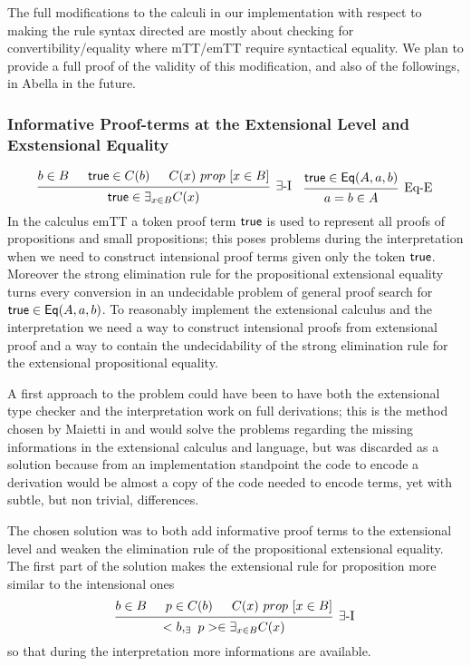 	The full modifications to the calculi in our implementation with respect to making the rule syntax directed are mostly about checking for convertibility/equality where mTT/emTT require syntactical equality. We plan to provide a full proof of the validity of this modification, and also of the followings, in Abella in the future.
	
	
	\subsubsection{Informative Proof-terms at the Extensional Level and Exstensional Equality}
	\[\begin{prooftree}
	\hypo{b\in B}
	\hypo{\s{true} \in C(b)}
	\hypo{C(x)\ prop\ [x \in B]}
	\infer3[\ensuremath{\exists}-\ensuremath{\text{I}}]{\s{true} \in \exists_{x\in B}{C(x)}}
	\end{prooftree}\quad
	\begin{prooftree}
	\hypo{\s{true}\in \s{Eq}(A,a,b)}
	\infer1[Eq-E]{a = b \in A}
	\end{prooftree}\]
	In the calculus emTT a token proof term ${\text{\ensuremath{\mathsf{true}}}}$ is used to represent all proofs of propositions and small propositions; this poses problems during the interpretation when we need to construct intensional proof terms given only the token ${\text{\ensuremath{\mathsf{true}}}}$. Moreover the strong elimination rule for the propositional extensional equality turns every conversion in an undecidable problem of general proof search for ${{\text{\ensuremath{\mathsf{true}}}}\in {\text{\ensuremath{\mathsf{Eq}}}}(A,a,b)}$.
	To reasonably implement the extensional calculus and the interpretation we need a way to construct  intensional proofs from extensional proof and a way to contain the undecidability of the strong elimination rule for the extensional propositional equality.
	
	A first approach to the problem could have been to have both the extensional type checker and the interpretation work on full derivations; this is the method chosen by Maietti in \cite{maietti2009minimalist} and would solve the problems regarding the missing informations in the extensional calculus and language, but was discarded as a solution because from an implementation standpoint the code to encode a derivation would be almost a copy of the code needed to encode terms, yet with subtle, but non trivial, differences.
	
	The chosen solution was to both add informative proof terms to the extensional level and weaken the elimination rule of the propositional extensional equality. The first part of the solution makes the extensional rule for proposition more similar to the intensional ones 
	\[
	\begin{prooftree}
	\hypo{b\in B}
	\hypo{p \in C(b)}
	\hypo{C(x)\ prop\ [x \in B]}
	\infer3[\ensuremath{\exists}-\ensuremath{\text{I}}]{<b,_{\exists}\  p> \in \exists_{x\in B}{C(x)}}
	\end{prooftree}
	\]
	so that during the interpretation more informations are available.
	
